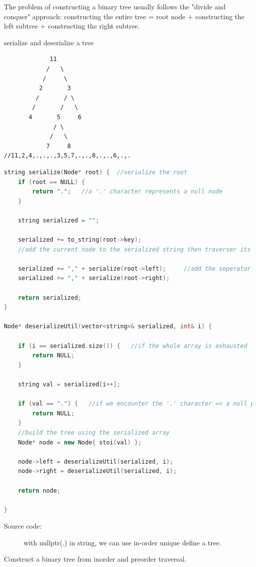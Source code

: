 \documentclass[a4paper,11pt,twoside]{book}
\begin{document}
	\par The problem of constructing a binary tree usually follows the "divide and conquer" approach: constructing the entire tree = root node + constructing the left subtree + constructing the right subtree.
	
	\par serialize and deserialize a tree
\begin{verbatim}
             11
            /   \
           /     \
          2       3
         /       / \
        /       /   \
       4       5     6
              / \
             /   \
            7     8
//11,2,4,.,.,.,3,5,7,.,.,8,.,.,6,.,.
\end{verbatim}


\begin{lstlisting}[frame=single, language=c++]
string serialize(Node* root) {  //serialize the root
	if (root == NULL) {
		return ".";   //a '.' character represents a null node
	}
	
	string serialized = "";
	
	serialized += to_string(root->key);  
	//add the current node to the serialized string then traverser its left and right children respectively
	
	serialized += "," + serialize(root->left);     //add the seperator after each node
	serialized += "," + serialize(root->right);
	
	return serialized;
}

Node* deserializeUtil(vector<string>& serialized, int& i) {
	
	if (i == serialized.size()) {   //if the whole array is exhausted
		return NULL;
	}
	
	string val = serialized[i++];
	
	if (val == ".") {   //if we encounter the '.' character => a null pointer
		return NULL;
	}
	//build the tree using the serialized array
	Node* node = new Node{ stoi(val) };
	
	node->left = deserializeUtil(serialized, i);
	node->right = deserializeUtil(serialized, i);
	
	return node;
	
}
\end{lstlisting}
\begin{description}
\item[Source code:] with nullptr(.) in string, we can use in-order unique define a tree.
\end{description}
	
	
	\par Construct a binary tree from inorder and preorder traversal.
	
\end{document}
